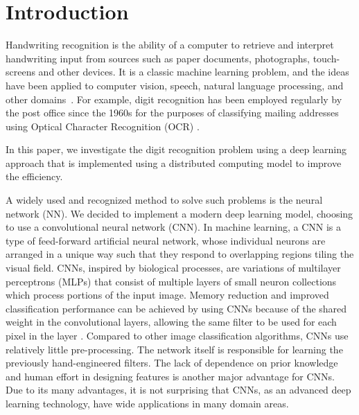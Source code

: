 \section{Introduction}
Handwriting recognition is the ability of a computer to retrieve and interpret handwriting input from sources such as paper documents, photographs, touch-screens and other devices. It is a classic machine learning problem, and the ideas have been applied to computer vision, speech, natural language processing, and other domains~\cite{dean2010mapreduce, gillick2006mapreduce}. For example, digit recognition has been employed regularly by the post office since the 1960s for the purposes of classifying mailing addresses using Optical Character Recognition (OCR) \cite{usps}. %


In this paper, we investigate the digit recognition problem using a deep learning approach that is implemented using a distributed computing model to improve the efficiency. 

A widely used and recognized method to solve such problems is the neural network (NN). We decided to implement a modern deep learning model, choosing to use a convolutional neural network (CNN). In machine learning, a CNN is a type of feed-forward artificial neural network, whose individual neurons are arranged in a unique way such that they respond to overlapping regions tiling the visual field. CNNs, inspired by biological processes, are variations of multilayer perceptrons (MLPs) that consist of multiple layers of small neuron collections which process portions of the input image. Memory reduction and improved classification performance can be achieved by using CNNs because of the shared weight in the convolutional layers, allowing the same filter to be used for each pixel in the layer \cite{lecun1995comparison}. Compared to other image classification algorithms, CNNs use relatively little pre-processing. The network itself is responsible for learning the previously hand-engineered filters. The lack of dependence on prior knowledge and human effort in designing features is another major advantage for CNNs. Due to its many advantages, it is not surprising that  CNNs, as an advanced deep learning technology, have wide applications in many domain areas.


